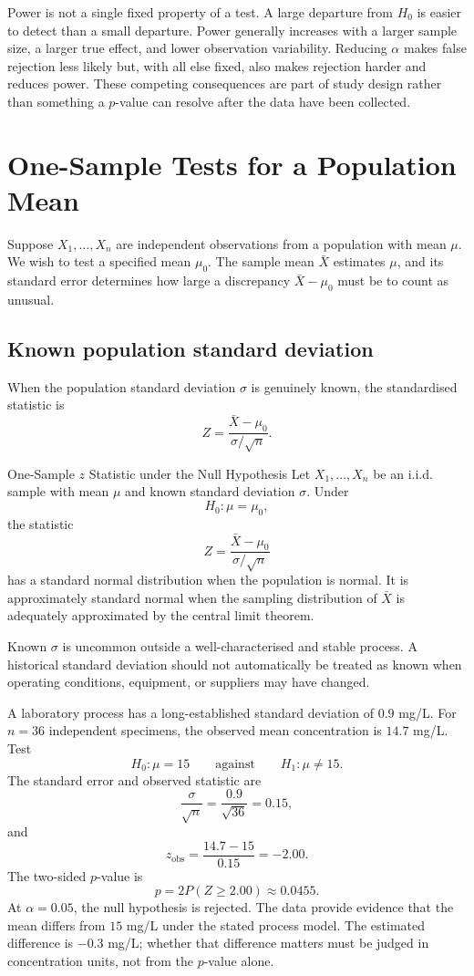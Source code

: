 Power is not a single fixed property of a test. A large departure from $H_0$ is easier to detect than a small departure. Power generally increases with a larger sample size, a larger true effect, and lower observation variability. Reducing $\alpha$ makes false rejection less likely but, with all else fixed, also makes rejection harder and reduces power. These competing consequences are part of study design rather than something a $p$-value can resolve after the data have been collected.

\section{One-Sample Tests for a Population Mean}
\label{sec:one-sample-mean-tests}

Suppose $X_1,\ldots,X_n$ are independent observations from a population with mean $\mu$. We wish to test a specified mean $\mu_0$. The sample mean $\bar X$ estimates $\mu$, and its standard error determines how large a discrepancy $\bar X-\mu_0$ must be to count as unusual.

\subsection{Known population standard deviation}

When the population standard deviation $\sigma$ is genuinely known, the standardised statistic is
\[
Z=\frac{\bar X-\mu_0}{\sigma/\sqrt n}.
\]

\begin{theorem}{One-Sample $z$ Statistic under the Null Hypothesis}
Let $X_1,\ldots,X_n$ be an i.i.d. sample with mean $\mu$ and known standard deviation $\sigma$. Under
\[
H_0:\mu=\mu_0,
\]
the statistic
\[
Z=\frac{\bar X-\mu_0}{\sigma/\sqrt n}
\]
has a standard normal distribution when the population is normal. It is approximately standard normal when the sampling distribution of $\bar X$ is adequately approximated by the central limit theorem.
\end{theorem}

Known $\sigma$ is uncommon outside a well-characterised and stable process. A historical standard deviation should not automatically be treated as known when operating conditions, equipment, or suppliers may have changed.

\begin{example}\par
A laboratory process has a long-established standard deviation of $0.9$ mg/L. For $n=36$ independent specimens, the observed mean concentration is $14.7$ mg/L. Test
\[
H_0:\mu=15
\qquad\text{against}\qquad
H_1:\mu\neq15.
\]
The standard error and observed statistic are
\[
\frac{\sigma}{\sqrt n}
=\frac{0.9}{\sqrt{36}}
=0.15,
\]
and
\[
z_{\mathrm{obs}}
=\frac{14.7-15}{0.15}
=-2.00.
\]
The two-sided $p$-value is
\[
p=2P(Z\geq2.00)\approx0.0455.
\]
At $\alpha=0.05$, the null hypothesis is rejected. The data provide evidence that the mean differs from $15$ mg/L under the stated process model. The estimated difference is $-0.3$ mg/L; whether that difference matters must be judged in concentration units, not from the $p$-value alone.
\end{example}

